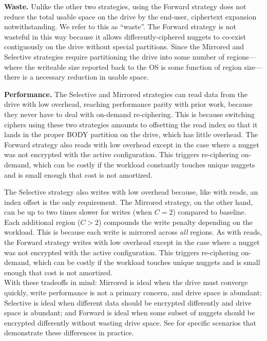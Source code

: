 \textbf{Waste.} Unlike the other two strategies, using the Forward strategy does
not reduce the total usable space on the drive by the end-user, ciphertext
expansion notwithstanding. We refer to this as ``waste''. The Forward strategy
is not wasteful in this way because it allows differently-ciphered nuggets to
co-exist contiguously on the drive without special partitions. Since the
Mirrored and Selective strategies require partitioning the drive into some
number of regions---where the writeable size reported back to the OS is some
function of region size---there is a necessary reduction in usable space.

\textbf{Performance.} The Selective and Mirrored strategies can read data from
the drive with low overhead, reaching performance parity with prior work,
because they never have to deal with on-demand re-ciphering. This is because
switching ciphers using these two strategies amounts to offsetting the read
index so that it lands in the proper BODY partition on the drive, which has
little overhead. The Forward strategy also reads with low overhead except in the
case where a nugget was not encrypted with the active configuration. This
triggers re-ciphering on-demand, which can be costly if the workload constantly
touches unique nuggets and is small enough that cost is not amortized.

The Selective strategy also writes with low overhead because, like with reads,
an index offset is the only requirement. The Mirrored strategy, on the other
hand, can be up to two times slower for writes (when $C = 2$) compared to
baseline. Each additional region ($C > 2$) compounds the write penalty depending
on the workload. This is because each write is mirrored across \emph{all}
regions. As with reads, the Forward strategy writes with low overhead except in
the case where a nugget was not encrypted with the active configuration. This
triggers re-ciphering on-demand, which can be costly if the workload touches
unique nuggets and is small enough that cost is not amortized.\\

With these tradeoffs in mind: Mirrored is ideal when the drive must converge
quickly, write performance is not a primary concern, and drive space is
abundant; Selective is ideal when different data should be encrypted differently
and drive space is abundant; and Forward is ideal when some subset of nuggets
should be encrypted differently without wasting drive space. See
 for specific scenarios that demonstrate these differences in
practice.

